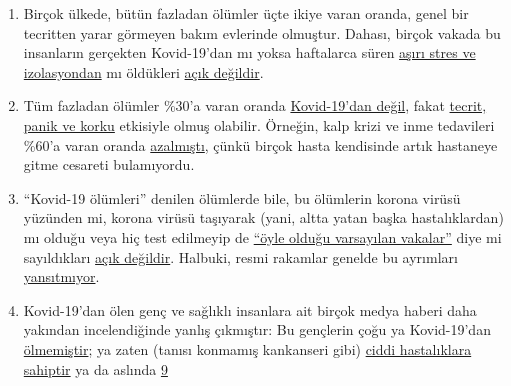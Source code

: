 \begin{enumerate}
\item
  Birçok ülkede, bütün fazladan ölümler üçte ikiye varan oranda, genel
  bir tecritten yarar görmeyen bakım evlerinde olmuştur. Dahası, birçok
  vakada bu insanların gerçekten Kovid-19'dan mı yoksa haftalarca süren
  \href{https://www.theguardian.com/world/2020/jun/05/covid-19-causing-10000-dementia-deaths-beyond-infections-research-says}{aşırı
  stres ve izolasyondan} mı öldükleri
  \href{https://www.hsj.co.uk/commissioning/thousands-of-extra-deaths-outside-hospital-not-attributed-to-covid-19/7027459.article}{açık
  değildir}.
\item
  Tüm fazladan ölümler \%30'a varan oranda
  \href{https://www.ons.gov.uk/peoplepopulationandcommunity/birthsdeathsandmarriages/deaths/articles/analysisofdeathregistrationsnotinvolvingcoronaviruscovid19englandandwales28december2019to1may2020/technicalannex}{Kovid-19'dan
  değil}, fakat
  \href{https://www.telegraph.co.uk/global-health/science-and-disease/two-new-waves-deaths-break-nhs-new-analysis-warns/}{tecrit,
  panik ve korku} etkisiyle olmuş olabilir. Örneğin, kalp krizi ve inme
  tedavileri \%60'a varan oranda
  \href{https://www.nytimes.com/2020/04/06/well/live/coronavirus-doctors-hospitals-emergency-care-heart-attack-stroke.html}{azalmıştı},
  çünkü birçok hasta kendisinde artık hastaneye gitme cesareti
  bulamıyordu.
\item
  ``Kovid-19 ölümleri'' denilen ölümlerde bile, bu ölümlerin korona
  virüsü yüzünden mi, korona virüsü taşıyarak (yani, altta yatan başka
  hastalıklardan) mı olduğu veya hiç test edilmeyip de
  \href{https://www.youtube.com/watch?v=V0lIWZpiRU0}{``öyle olduğu
  varsayılan vakalar''} diye mi sayıldıkları
  \href{https://spectator.us/understand-report-figures-covid-deaths/}{açık
  değildir}. Halbuki, resmi rakamlar genelde bu ayrımları
  \href{https://www.hsj.co.uk/coronavirus/systematic-reviews-to-discover-true-cause-of-outbreak-deaths/7027491.article}{yansıtmıyor}.
\item
  Kovid-19'dan ölen genç ve sağlıklı insanlara ait birçok medya haberi
  daha yakından incelendiğinde yanlış çıkmıştır: Bu gençlerin çoğu ya
  Kovid-19'dan
  \href{https://www.dailymail.co.uk/news/article-8193487/Coroner-refuses-rule-COVID-19-cause-death-six-week-old-Connecticut-baby.html}{ölmemiştir};
  ya zaten (tanısı konmamış kankanseri gibi)
  \href{https://sports.yahoo.com/spanish-football-coach-francisco-garcia-163153573.html}{ciddi
  hastalıklara sahiptir} ya da aslında
  \href{https://www.n-tv.de/panorama/Neunjaehrige-Corona-Tote-war-109-Jahre-alt-article21753784.html}{9
}
\end{enumerate}
